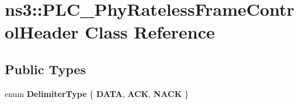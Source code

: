 \hypertarget{classns3_1_1PLC__PhyRatelessFrameControlHeader}{\section{ns3\-:\-:\-P\-L\-C\-\_\-\-Phy\-Rateless\-Frame\-Control\-Header \-Class \-Reference}
\label{classns3_1_1PLC__PhyRatelessFrameControlHeader}
}
\subsection*{\-Public \-Types}
\begin{DoxyCompactItemize}
\item 
enum {\bfseries \-Delimiter\-Type} \{ {\bfseries \-D\-A\-T\-A}, 
{\bfseries \-A\-C\-K}, 
{\bfseries \-N\-A\-C\-K}
 \}
\end{DoxyCompactItemize}
